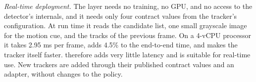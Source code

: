 \emph{Real-time deployment.} The layer needs no training, no GPU, and no
access to the detector's internals, and it needs only four contract values
from the tracker's configuration. At run time it reads the candidate list, one
small grayscale image for the motion cue, and the tracks of the previous
frame. On a 4-vCPU processor it takes 2.95 ms per frame, adds 4.5\% to the end-to-end time, and makes the tracker
itself faster. \scl{} therefore adds very little latency and is
suitable for real-time use. New trackers are added through their published
contract values and an adapter, without changes to the policy.
